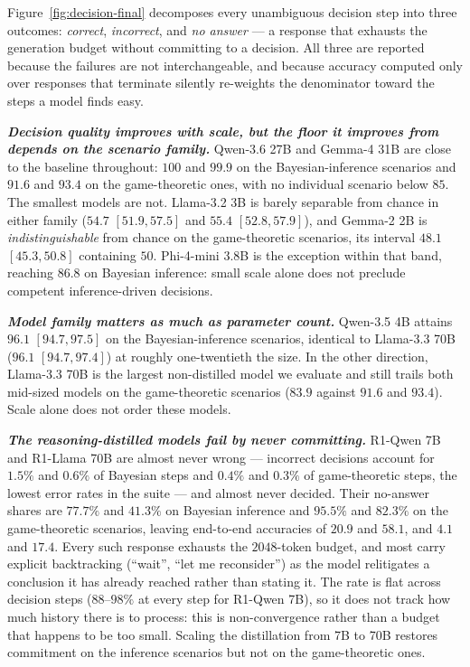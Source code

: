 Figure~\ref{fig:decision-final} decomposes every unambiguous decision step into
three outcomes: \emph{correct}, \emph{incorrect}, and \emph{no answer} --- a
response that exhausts the generation budget without committing to a decision.
All three are reported because the failures are not interchangeable, and because
accuracy computed only over responses that terminate silently re-weights the
denominator toward the steps a model finds easy.

\textbf{\textit{Decision quality improves with scale, but the floor it improves
from depends on the scenario family.}}
Qwen-3.6 27B and Gemma-4 31B are close to the baseline throughout: $100$ and
$99.9$ on the Bayesian-inference scenarios and $91.6$ and $93.4$ on the
game-theoretic ones, with no individual scenario below $85$. The smallest models
are not. Llama-3.2 3B is barely separable from chance in either family ($54.7$
$[51.9,57.5]$ and $55.4$ $[52.8,57.9]$), and Gemma-2 2B is \emph{indistinguishable}
from chance on the game-theoretic scenarios, its interval $48.1$ $[45.3,50.8]$
containing $50$. Phi-4-mini 3.8B is the exception within that band, reaching
$86.8$ on Bayesian inference: small scale alone does not preclude competent
inference-driven decisions.

\textbf{\textit{Model family matters as much as parameter count.}}
Qwen-3.5 4B attains $96.1$ $[94.7,97.5]$ on the Bayesian-inference scenarios,
identical to Llama-3.3 70B ($96.1$ $[94.7,97.4]$) at roughly one-twentieth the
size. In the other direction, Llama-3.3 70B is the largest non-distilled model we
evaluate and still trails both mid-sized models on the game-theoretic scenarios
($83.9$ against $91.6$ and $93.4$). Scale alone does not order these models.

\textbf{\textit{The reasoning-distilled models fail by never committing.}}
R1-Qwen 7B and R1-Llama 70B are almost never wrong --- incorrect decisions
account for $1.5\%$ and $0.6\%$ of Bayesian steps and $0.4\%$ and $0.3\%$ of
game-theoretic steps, the lowest error rates in the suite --- and almost never
decided. Their no-answer shares are $77.7\%$ and $41.3\%$ on Bayesian inference
and $95.5\%$ and $82.3\%$ on the game-theoretic scenarios, leaving end-to-end
accuracies of $20.9$ and $58.1$, and $4.1$ and $17.4$. Every such response
exhausts the $2048$-token budget, and most carry explicit backtracking
(``wait'', ``let me reconsider'') as the model relitigates a conclusion it has
already reached rather than stating it. The rate is flat across decision steps
($88$--$98\%$ at every step for R1-Qwen 7B), so it does not track how much
history there is to process: this is non-convergence rather than a budget that
happens to be too small. Scaling the distillation from 7B to 70B restores
commitment on the inference scenarios but not on the game-theoretic ones.

